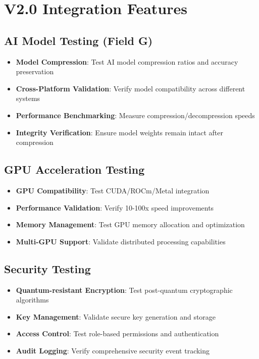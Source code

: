 \documentclass[12pt,a4paper]{article}
\begin{document}
\section{V2.0 Integration Features}

\subsection{AI Model Testing (Field G)}
\begin{itemize}
    \item \textbf{Model Compression}: Test AI model compression ratios and accuracy preservation
    \item \textbf{Cross-Platform Validation}: Verify model compatibility across different systems
    \item \textbf{Performance Benchmarking}: Measure compression/decompression speeds
    \item \textbf{Integrity Verification}: Ensure model weights remain intact after compression
\end{itemize}

\subsection{GPU Acceleration Testing}
\begin{itemize}
    \item \textbf{GPU Compatibility}: Test CUDA/ROCm/Metal integration
    \item \textbf{Performance Validation}: Verify 10-100x speed improvements
    \item \textbf{Memory Management}: Test GPU memory allocation and optimization
    \item \textbf{Multi-GPU Support}: Validate distributed processing capabilities
\end{itemize}

\subsection{Security Testing}
\begin{itemize}
    \item \textbf{Quantum-resistant Encryption}: Test post-quantum cryptographic algorithms
    \item \textbf{Key Management}: Validate secure key generation and storage
    \item \textbf{Access Control}: Test role-based permissions and authentication
    \item \textbf{Audit Logging}: Verify comprehensive security event tracking
\end{itemize}
\end{document}
